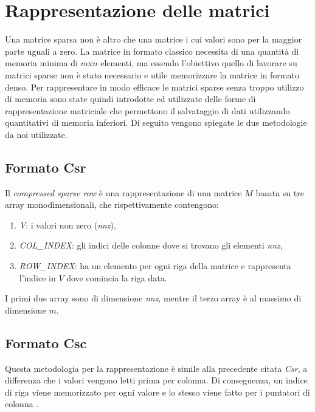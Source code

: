 \documentclass[]{IEEEtran}
\begin{document}
\section{Rappresentazione delle matrici}\label{rappresentazione}
Una matrice sparsa non è altro che una matrice i cui valori sono per la maggior parte uguali a zero. La matrice in formato classico necessita di una quantità di memoria minima di $ m $x$ n $ elementi, ma essendo l'obiettivo quello di lavorare su matrici sparse non è stato necessario e utile memorizzare la matrice in formato denso.\newline
Per rappresentare in modo efficace le matrici sparse senza troppo utilizzo di memoria sono state quindi introdotte ed utilizzate delle forme di rappresentazione matriciale che permettono il salvataggio di dati utilizzando quantitativi di memoria inferiori.\newline
Di seguito vengono spiegate le due metodologie da noi utilizzate.

\subsection{Formato Csr}
\label{csr}
Il \textit{compressed sparse row} è una rappresentazione di una matrice $ M $ basata su tre array monodimensionali, che rispettivamente contengono:
\begin{enumerate}
\item \textit{V}: i valori non zero (\textit{nnz}),
\item \textit{COL\_INDEX}: gli indici delle colonne dove si trovano gli elementi \textit{nnz},
\item \textit{ROW\_INDEX}: ha un elemento per ogni riga della matrice e rappresenta l'indice in $ V $ dove comincia la riga data.
\end{enumerate}
I primi due array sono di dimensione \textit{nnz}, mentre il terzo array è al massimo di dimensione $ m $.

\subsection{Formato Csc}
\label{csc}
Questa metodologia per la rappresentazione è simile alla precedente citata \textit{Csr}, a differenza che i valori vengono letti prima per colonna. Di conseguenza, un indice di riga viene memorizzato per ogni valore e lo stesso viene fatto per i puntatori di colonna .
\end{document}
